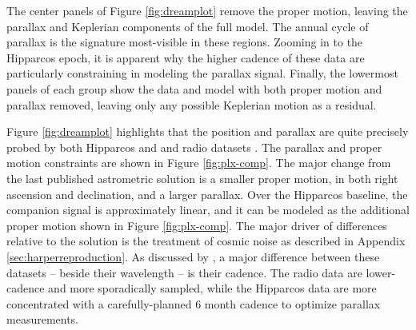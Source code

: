 \documentclass[twocolumn]{aastex631}
\begin{document}
The center panels of Figure \ref{fig:dreamplot} remove the proper motion, leaving the parallax and Keplerian components of the full model. The annual cycle of parallax is the signature most-visible in these regions. Zooming in to the Hipparcos epoch, it is apparent why the higher cadence of these data are particularly constraining in modeling the parallax signal. Finally, the lowermost panels of each group show the data and model with both proper motion and parallax removed, leaving only any possible Keplerian motion as a residual. 



Figure \ref{fig:dreamplot} highlights that the position and parallax are quite precisely probed by both Hipparcos and and radio datasets \citep{2017AJ....154...11H}. 
The parallax and proper motion constraints are shown in Figure \ref{fig:plx-comp}. The major change from the last published astrometric solution \citep{2017AJ....154...11H} is a smaller proper motion, in both right ascension and declination, and a larger parallax. Over the Hipparcos baseline, the companion signal is approximately linear, and it can be modeled as the additional proper motion shown in Figure \ref{fig:plx-comp}. The major driver of differences relative to the \citet{2017AJ....154...11H} solution is the treatment of cosmic noise as described in Appendix \ref{sec:harperreproduction}. As discussed by \citet{2017AJ....154...11H}, a major difference between these datasets -- beside their wavelength -- is their cadence. The radio data are lower-cadence and more sporadically sampled, while the Hipparcos data are more concentrated with a carefully-planned 6 month cadence to optimize parallax measurements. 
\end{document}
